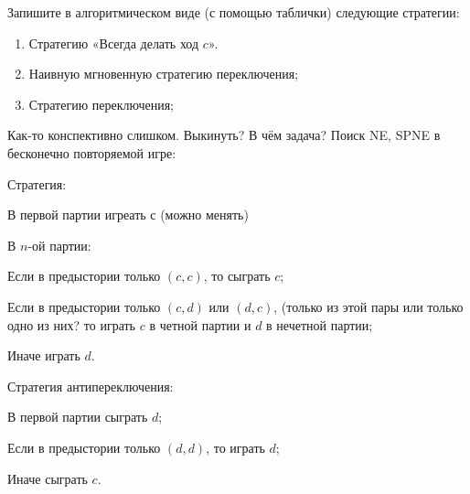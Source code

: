\begin{problem}

Запишите в алгоритмическом виде (с помощью таблички) следующие стратегии:
\begin{enumerate}
\item  Стратегию «Всегда делать ход  $c$».\par
\item Наивную мгновенную стратегию переключения;\par
\item  Стратегию переключения;
\end{enumerate}


\begin{sol}

\end{sol}
\end{problem}



\begin{problem}
{\red Как-то конспективно слишком. Выкинуть? В чём задача?}
 Поиск NE, SPNE в бесконечно повторяемой игре: \par
Стратегия: \par
В первой партии игреать с (можно менять) \par
В $n$-ой партии:\par
Если в предыстории только $(c,c)$, то сыграть $c$; \par
Если в предыстории только $(c,d)$ или $(d,c)$, ({\red только из этой пары или только одно из них?} то играть $c$ в
четной партии и
$d$ в нечетной партии; \par
Иначе играть $d$. \par

Стратегия антипереключения: \par
В первой партии сыграть $d$; \par
Если в предыстории только $(d,d)$, то играть $d$; \par
Иначе сыграть $c$.



\begin{sol}

\end{sol}
\end{problem}



